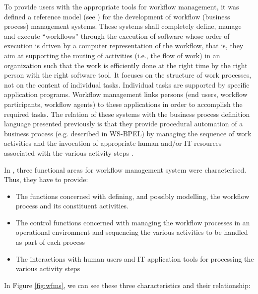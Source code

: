To provide users with the appropriate tools for workflow management, 
it was defined a reference model (see \cite{hollingsworth95}) for the development of workflow (business process) management systems. 
These systems shall completely define, manage and execute ``workflows'' through the execution of software
whose order of execution is driven by a computer representation of the workflow, that is, 
they aim at supporting the routing of activities (i.e., the flow of work) in an organization such
that the work is efficiently done at the right time by the right person with the right
software tool. It focuses on the structure of work processes, not on the content of 
individual tasks. Individual tasks are supported by specific application programs.
Workflow management links persons (end users, workflow participants, workflow
agents) to these applications in order to accomplish the required tasks. The relation of these systems with the business process
definition language presented previously is that they provide procedural automation of a business process (e.g. described in WS-BPEL) by
managing the sequence of work activities and the invocation of appropriate human and/or IT resources
associated with the various activity steps \cite{hollingsworth95}. 

In \cite{hollingsworth95}, three functional areas for workflow management system were characterised. Thus, they have to provide:

\begin{itemize}
\item The functions concerned with defining, and possibly modelling, the workflow process and its
constituent activities.

\item The control functions concerned with managing the workflow processes in an operational
environment and sequencing the various activities to be handled as part of each process

\item The interactions with human users and IT application tools for processing the various activity
steps

\end{itemize}

In Figure \ref{fig:wfms}, we can see these three characteristics and their relationship:


